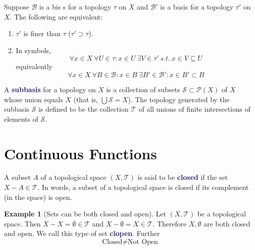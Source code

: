 \documentclass[11pt]{article}
\numberwithin{equation}{section}
\newcommand{\navy}[1]{\textcolor{MidnightBlue}{\bf #1}}
\newcounter{theo}[section]\setcounter{theo}{0}
\theoremstyle{definition}
\theoremstyle{definition}
\newtheorem{example}{\color{WildStrawberry}Example}[section]
\def\ss{\subset}
\def\sse{\subseteq}
\newcommand{\1}{\mathbbm 1}
\def\t{\tau}
\newcommand{\pP}{\mathcal P}
\newcommand{\tT}{\mathcal T}
\newcommand{\bB}{\mathcal B}
\newcommand{\sS}{\mathcal S}
\begin{document}
\begin{lemma}
	Suppose $\bB$ is a bis s for a topology $\t$ on $X$ and $\bB'$ is a basis for a topology $\t'$ on $X$. The following are equivalent:
	\begin{enumerate}
		\item $\t'$ is finer than $\t$ ($\t' \supset \t$). 
		\item In symbols,
		\begin{equation}
			\forall x\in X \ \forall U \in \t: x \in U \ \exists V \in \t' \ s.t. \ x \in V\sse U
		\end{equation}
		equivalently
		\begin{equation}
			\forall x \in X \ \forall B \in \bB : x \in B \ \exists B' \in \bB' : x \in B' \ss B
		\end{equation}
	\end{enumerate}
\end{lemma}

\begin{definition}[Subbasis]
	A \navy{subbasis} for a topology on $X$ is a collection of subsets $\sS \ss \pP(X)$ of $X$ whose union equals $X$ (that is, $\bigcup \sS = X$). The topology generated by the subbasis $\sS$ is defined to be the collection $\tT$ of all unions of finite intersections of elements of $\sS$.
\end{definition}

\section{Continuous Functions}

\begin{definition}[Closed]
	A subset $A$ of a topological space $(X,\tT)$ is said to be \navy{closed} if the set $X - A \in \tT$. In words, a subset of a topological space is closed if its complement (in the space) is open. 
\end{definition}

\begin{example}[Sets can be both closed and open]
	Let $(X,\tT)$ be a topological space. Then $X - X = \emptyset \in \tT$ and $X - \emptyset = X \in \tT$. Therefore $X, \emptyset$ are both closed and open. We call this type of set \navy{clopen}. Further
	\begin{equation}
		\text{Closed} \neq \text{Not Open}
	\end{equation}
\end{example}
\end{document}
